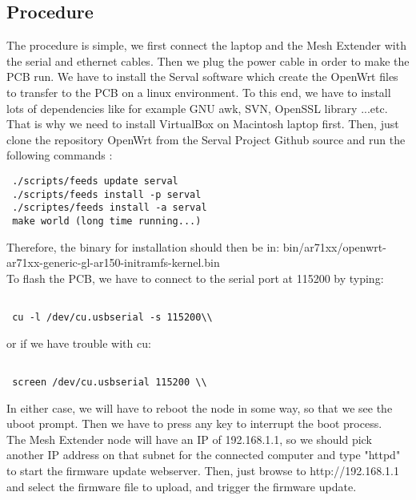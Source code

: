 \subsection{Procedure}
The procedure is simple, we first connect the laptop and the Mesh Extender with the serial and ethernet cables. Then we plug the power cable in order to make the PCB run. We have to install the Serval software which create the OpenWrt files to transfer to the PCB on a linux environment. To this end, we have to install lots of dependencies like for example GNU awk, SVN, OpenSSL library ...etc. That is why we need to install VirtualBox on Macintosh laptop first. Then, just clone the repository OpenWrt from the Serval Project Github source and run the following commands :\\
\begin{lstlisting}
 ./scripts/feeds update serval
 ./scripts/feeds install -p serval
 ./scriptes/feeds install -a serval
 make world (long time running...)
\end{lstlisting}
Therefore, the binary for installation should then be in: bin/ar71xx/openwrt-ar71xx-generic-gl-ar150-initramfs-kernel.bin \\
To flash the PCB, we have to connect to the serial port at 115200 by typing:\\
\begin{lstlisting}

 cu -l /dev/cu.usbserial -s 115200\\
\end{lstlisting}

or if we have trouble with cu: \\ 
\begin{lstlisting}

 screen /dev/cu.usbserial 115200 \\
\end{lstlisting}

In either case, we will have to reboot the node in some way, so that we see the uboot prompt. Then we have to press any key to interrupt the boot process.\\
The Mesh Extender node will have an IP of 192.168.1.1, so we should pick another IP address on that subnet for the connected computer and type "httpd" to start the firmware update webserver. Then, just browse to http://192.168.1.1 and select the firmware file to upload, and trigger the firmware update. \\

